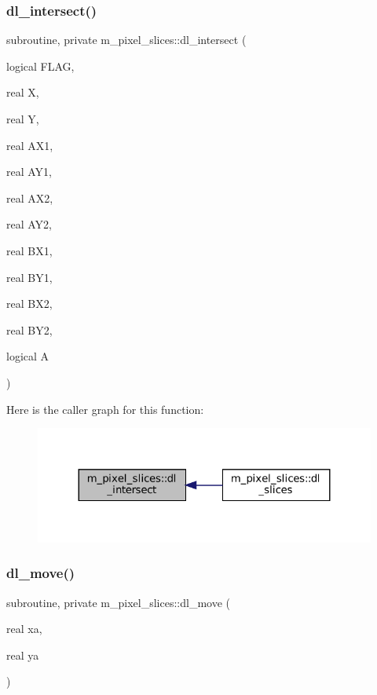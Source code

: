 \subsubsection{\texorpdfstring{dl\+\_\+intersect()}{dl\_intersect()}}
{\footnotesize\ttfamily subroutine, private m\+\_\+pixel\+\_\+slices\+::dl\+\_\+intersect (\begin{DoxyParamCaption}\item[{logical}]{F\+L\+AG,  }\item[{real}]{X,  }\item[{real}]{Y,  }\item[{real}]{A\+X1,  }\item[{real}]{A\+Y1,  }\item[{real}]{A\+X2,  }\item[{real}]{A\+Y2,  }\item[{real}]{B\+X1,  }\item[{real}]{B\+Y1,  }\item[{real}]{B\+X2,  }\item[{real}]{B\+Y2,  }\item[{logical}]{A }\end{DoxyParamCaption})\hspace{0.3cm}{\ttfamily [private]}}

Here is the caller graph for this function\+:\nopagebreak
\begin{figure}[H]
\begin{center}
\leavevmode
\includegraphics[width=324pt]{namespacem__pixel__slices_a1508683ec3b2444091bb34d40b5d8b93_icgraph}
\end{center}
\end{figure}
\mbox{\label{namespacem__pixel__slices_ab9e9530d7fb4fbea1bc5d52744498731}} 
\subsubsection{\texorpdfstring{dl\+\_\+move()}{dl\_move()}}
{\footnotesize\ttfamily subroutine, private m\+\_\+pixel\+\_\+slices\+::dl\+\_\+move (\begin{DoxyParamCaption}\item[{real}]{xa,  }\item[{real}]{ya }\end{DoxyParamCaption})\hspace{0.3cm}{\ttfamily [private]}}



